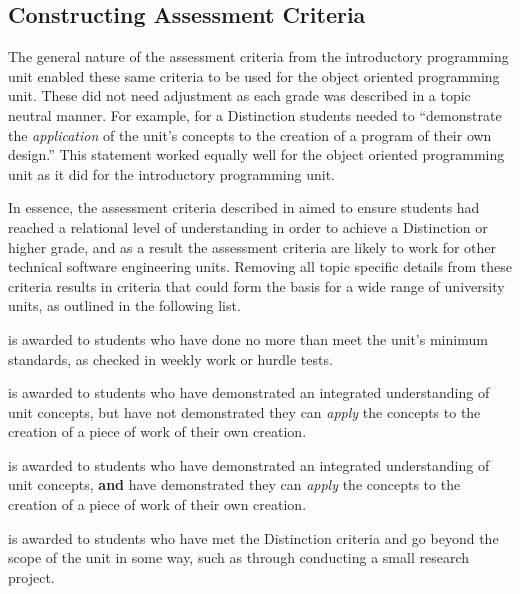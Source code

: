 
\subsection{Constructing Assessment Criteria} %
\label{sub:oop_constructing_assessment_criteria}

The general nature of the assessment criteria from the introductory programming unit enabled these same criteria to be used for the object oriented programming unit. These did not need adjustment as each grade was described in a topic neutral manner. For example, for a Distinction students needed to ``demonstrate the \emph{application} of the unit's concepts to the creation of a program of their own design.'' This statement worked equally well for the object oriented programming unit as it did for the introductory programming unit. 

In essence, the assessment criteria described in  aimed to ensure students had reached a relational level of understanding in order to achieve a Distinction or higher grade, and as a result the assessment criteria are likely to work for other technical software engineering units. Removing all topic specific details from these criteria results in criteria that could form the basis for a wide range of university units, as outlined in the following list.

\begin{description}
	\item[Pass] is awarded to students who have done no more than meet the unit's minimum standards, as checked in weekly work or hurdle tests. 
	\item[Credit] is awarded to students who have demonstrated an integrated understanding of unit concepts, but have not demonstrated they can \emph{apply} the concepts to the creation of a piece of work of their own creation.
	\item[Distinction] is awarded to students who have demonstrated an integrated understanding of unit concepts, \textbf{and} have demonstrated they can \emph{apply} the concepts to the creation of a piece of work of their own creation.
	\item[High Distinction]  is awarded to students who have met the Distinction criteria and go beyond the scope of the unit in some way, such as through conducting a small research project.
\end{description}

